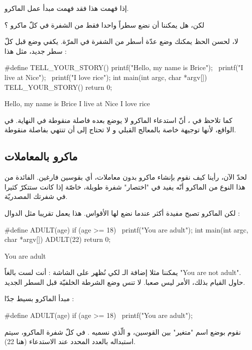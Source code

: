 إذا فهمت هذا فقد فهمت مبدأ عمل الماكرو.

\begin{question}
  لكن، هل يمكننا أن نضع سطراً واحدا فقط من الشفرة في كلّ ماكرو ؟
\end{question}

لا، لحسن الحظ يمكنك وضع عدّة أسطر من الشفرة في المرّة. يكفي وضع
\InlineCode{\textbackslash}
قبل كلّ سطر جديد، مثل هذا :

\begin{Csource}
#define TELL_YOUR_STORY() printf("Hello, my name is Brice\n"); \
                          printf("I live at Nice\n"); \
                          printf("I love rice\n");
int main(int argc, char *argv[])
{
	TELL_YOUR_STORY()
	return 0;
}
\end{Csource}

\begin{Console}
Hello, my name is Brice
I live at Nice
I love rice
\end{Console}

كما تلاحظ في
،
أنّ استدعاء الماكرو لا يوضع بعده فاصلة منقوطة في النهاية. في الواقع، لأنها توجيهة خاصة بالمعالج القبلي و لا تحتاج إلى  أن تنتهي بفاصلة منقوطة.

\subsection{ماكرو بالمعاملات}
لحدّ الآن، رأينا كيف نقوم بإنشاء ماكرو بدون معاملات، أي بقوسين فارغين. الفائدة من هذا النوع من الماكرو أنّه يفيد في "اختصار" شفرة طويلة، خاصّة إذا كانت ستتكرّ كثيرا في شفرتك المصدريّة.

لكن الماكرو تصبح مفيدة أكثر عندما نضع لها الأقواس. هذا يعمل تقريبا مثل الدوال :
\begin{Csource}
#define ADULT(age) if (age >= 18) \
                    printf("You are adult\n");
int main(int argc, char *argv[])
{
	ADULT(22)
	return 0;
}
\end{Csource}

\begin{Console}
You are adult
\end{Console}

\begin{information}
يمكننا مثلا إضافة الـ
لكي نُظهر على الشاشة : أنت لست بالغاً
"\textenglish{You are not adult}".
حاول القيام بذلك، الأمر ليس صعبا. لا تنس وضع الشرطة الخلفيّة
\InlineCode{\textbackslash}
قبل السطر الجديد.
\end{information}
مبدأ الماكرو بسيط جدّا :
\begin{Csource}
#define ADULT(age) if (age >= 18) \
                    printf("You are adult\n");
\end{Csource}
نقوم بوضع اسم "متغير" بين القوسين، و الّذي نسميه
.
في كلّ شفرة الماكرو،
\InlineCode{age}
سيتم استبداله بالعدد المحدد عند الاستدعاء (هنا 22).


